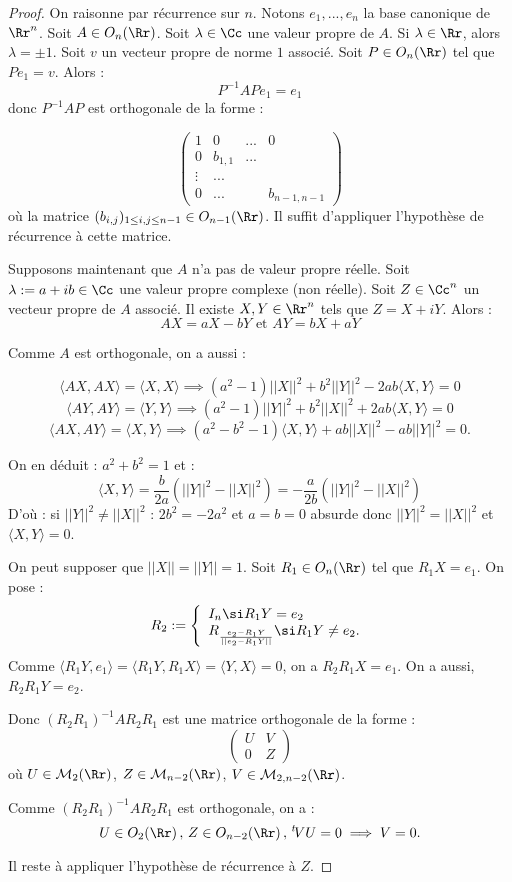 \documentclass[class=report,crop=false]{standalone}
\begin{document}
\begin{proof} On raisonne par récurrence sur $n$. Notons $e_1,...,e_n$ la base canonique de $\Rr^n$. Soit $A \in O_n(\Rr)$. Soit $\lambda \in \Cc$ une valeur propre de $A$. Si $\lambda \in \Rr$, alors $\lambda =\pm 1$. Soit $v$ un vecteur propre de norme $1$ associé. Soit $P \in O_n(\Rr)$ tel que $Pe_1 = v$. Alors :
\[P^{-1} A P e_1 = e_1\]
donc $P^{-1} A P$ est orthogonale de la forme :

\[\left(\begin{array}{cccc}
1 & 0 & ...& 0\\
0 & b_{1,1}&...&\\
\vdots &...&&\\
0&...&&b_{n-1,n-1}
\end{array}\right)\] où la matrice $(b_{i,j})_{1 \le i,j\le n-1} \in O_{n-1}(\Rr)$. Il suffit d'appliquer l'hypothèse de récurrence à cette matrice.

Supposons maintenant que $A$ n'a pas de valeur propre réelle. Soit $\lambda :=a +ib \in \Cc$ une valeur propre complexe (non réelle).  Soit $Z \in \Cc^n$ un vecteur propre de $A$ associé. Il existe $X,Y \in \Rr^n$ tels que $Z = X+iY$. Alors :
\[AX = aX - bY \text{ et } AY = bX +a Y\]

Comme $A$ est orthogonale, on a aussi :

\[\langle A X ,AX \rangle = \langle X, X \rangle \implies (a^2-1)||X||^2 +b^2||Y||^2 - 2ab \langle X,Y\rangle =0\]
\[\langle A Y ,AY \rangle = \langle Y, Y \rangle \implies (a^2-1)||Y||^2 +b^2||X||^2 + 2ab \langle X,Y\rangle =0\]
\[\langle A X ,AY \rangle = \langle X, Y \rangle \implies (a^2-b^2-1)\langle X,Y\rangle +ab ||X||^2 -ab||Y||^2  =0 .\]

On en déduit : $a^2 + b^2 =1$ et :
\[\langle X,Y\rangle = \frac{b}{2a}(||Y||^2-||X||^2) = -\frac{a}{2b}(||Y||^2-||X||^2)\]
D'où : si $||Y||^2\neq ||X||^2$ : $2b^2 = -2a^2 $ et $a=b=0$ absurde donc $||Y||^2 = ||X||^2$ et $\langle X,Y\rangle =0$.

On peut supposer que $||X|| = ||Y|| =1$. Soit $R_1 \in O_n(\Rr)$ tel que $R_1 X = e_1$. On pose :
\[R_2:=\left\{\begin{array}{l}
I_n \si R_1 Y = e_2\\
R_{\frac{e_2-R_1Y}{||e_2-R_1Y||}} \si R_1 Y \neq e_2.
\end{array} \right.\]
Comme $\langle R_1 Y , e_1\rangle = \langle R_1 Y , R_1 X \rangle = \langle Y, X\rangle =0$, on a $R_2R_1 X = e_1$. On a aussi, $R_2R_1 Y = e_2$.

Donc $(R_2R_1)^{-1} AR_2R_1$ est une matrice orthogonale de la forme :
\[\left(\begin{array}{cc}
U&V\\
0&Z
\end{array}\right)\]
où $U \in \mathcal{M}_2(\Rr)$, $Z \in \mathcal{M}_{n-2}(\Rr)$, $V \in \mathcal{M}_{2,n-2}(\Rr)$.

Comme $ (R_2R_1)^{-1} AR_2R_1$ est orthogonale, on a :
\[U \in O_2(\Rr) \,,\, Z \in O_{n-2}(\Rr)\,,\, {}^t\!V U =0 \implies  V =0 .\]

Il reste à appliquer l'hypothèse de récurrence à $Z$.

\end{proof}
\end{document}

